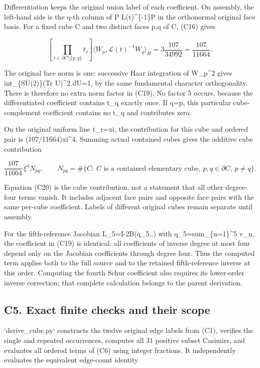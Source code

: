 \documentclass[11pt]{article}
\begin{document}
Differentiation keeps the original union label of each coefficient. On assembly, the left-hand side is the q-th column of P L(t)\textasciicircum{}\{-1\}P in the orthonormal original face basis. For a fixed cube C and two distinct faces p,q of C, (C16) gives

\[
 \boxed{
 \left[\prod_{r\in\partial C\setminus\{p,q\}}t_r\right]
 \bigl\langle W_p,\mathcal L(t)^{-1}W_q\bigr\rangle_H
 =3\frac{107}{34992}=\frac{107}{11664}.} \tag{C19}
\]

The original face norm is one: successive Haar integration of W\_p\textasciicircum{}2 gives int\_\{SU(2)\}(Tr U)\textasciicircum{}2 dU=1, by the same fundamental character orthogonality. There is therefore no extra norm factor in (C19). No factor 5 occurs, because the differentiated coefficient contains t\_q exactly once. If q=p, this particular cube-complement coefficient contains no t\_q and contributes zero.

On the original uniform line t\_r=xi, the contribution for this cube and ordered pair is (107/11664)xi\textasciicircum{}4. Summing actual contained cubes gives the additive cube contribution

\[
 \frac{107}{11664}\,\xi^4 N_{pq},\qquad
 N_{pq}=\#\{C:\ C\text{ is a contained elementary cube},\ p,q\in\partial C,\ p\ne q\}. \tag{C20}
\]

Equation (C20) is the cube contribution, not a statement that all other degree-four terms vanish. It includes adjacent face pairs and opposite face pairs with the same per-cube coefficient. Labels of different original cubes remain separate until assembly.

For the fifth-reference Jacobian L\_5=I-2B(q\_5,.) with q\_5=sum\_\{n=1\}\textasciicircum{}5 v\_n, the coefficient in (C19) is identical: all coefficients of inverse degree at most four depend only on the Jacobian coefficients through degree four. Thus the computed term applies both to the full source and to the retained fifth-reference inverse at this order. Computing the fourth Schur coefficient also requires its lower-order inverse correction; that complete calculation belongs to the parent derivation.

\subsection*{C5. Exact finite checks and their scope}

`derive\_cube.py` constructs the twelve original edge labels from (C1), verifies the single and repeated occurrences, computes all 31 positive subset Casimirs, and evaluates all ordered terms of (C6) using integer fractions. It independently evaluates the equivalent edge-count identity
\end{document}
